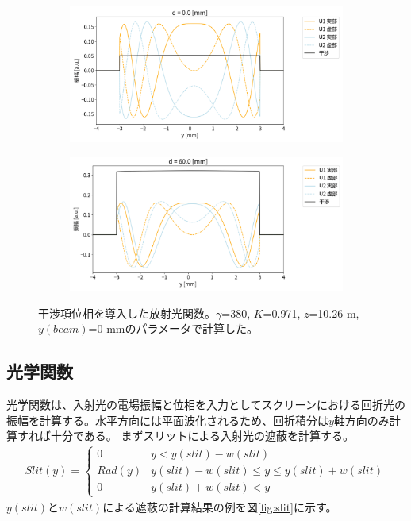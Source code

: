 \documentclass[a4paper,11pt,uplatex]{jsbook}
\begin{document}
\begin{figure}[h]
  \begin{subfigure}[h]{0.45\linewidth}
    \centering
    \includegraphics[width=\linewidth]{image/2-int-d00png.png}
  \end{subfigure}
  \begin{subfigure}[h]{0.45\linewidth}
    \centering
    \includegraphics[width=\linewidth]{image/2-int-d60.png}
  \end{subfigure}
  \caption[放射光関数の干渉項位相]{干渉項位相を導入した放射光関数。$\gamma$=380, $K$=0.971, $z$=10.26 m,$y(beam)$=0 mmのパラメータで計算した。}
  \label{fig:int}
\end{figure}

\subsection{光学関数}
光学関数は、入射光の電場振幅と位相を入力としてスクリーンにおける回折光の振幅を計算する。水平方向には平面波化されるため、回折積分は$y$軸方向のみ計算すれば十分である。
まずスリットによる入射光の遮蔽を計算する。
\begin{align}
  Slit(y) = 
  \begin{cases}
    0       &  y  < y(slit) - w(slit)\\
    Rad(y)  &  y(slit) - w(slit) \leq y \leq y(slit) + w(slit)\\
    0       &  y(slit) + w(slit) < y
  \end{cases}
\end{align}
$y(slit)$と$w(slit)$による遮蔽の計算結果の例を図\ref{fig:slit}に示す。
\end{document}
